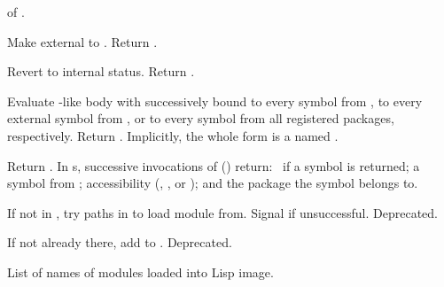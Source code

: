 \begin{LIST}{1cm}
  {
   of .
  }

  {
  Make  external to . Return \retval{\T}.
  }

  {
  Revert  to internal status. Return \retval{\T}.
  }
  
  {
  Evaluate -like body with  successively bound to every
  symbol from , to every external symbol from
  , or to every symbol from all registered packages, 
  respectively. Return .  Implicitly,
  the whole form is a  named \NIL. 
  }

  {
  Return . In s, successive
  invocations of  () return: \T\ if a symbol is returned;
  a symbol from ; accessibility
  (, , or ); and the
  package the symbol belongs to.
  }

  {
  If not in , try paths in  to load
  module from. Signal  if unsuccessful. Deprecated.
  }

  {
  If not already there, add  to
  . Deprecated. 
  }

  {
  List of names of modules loaded into Lisp image.
  }

\end{LIST}



